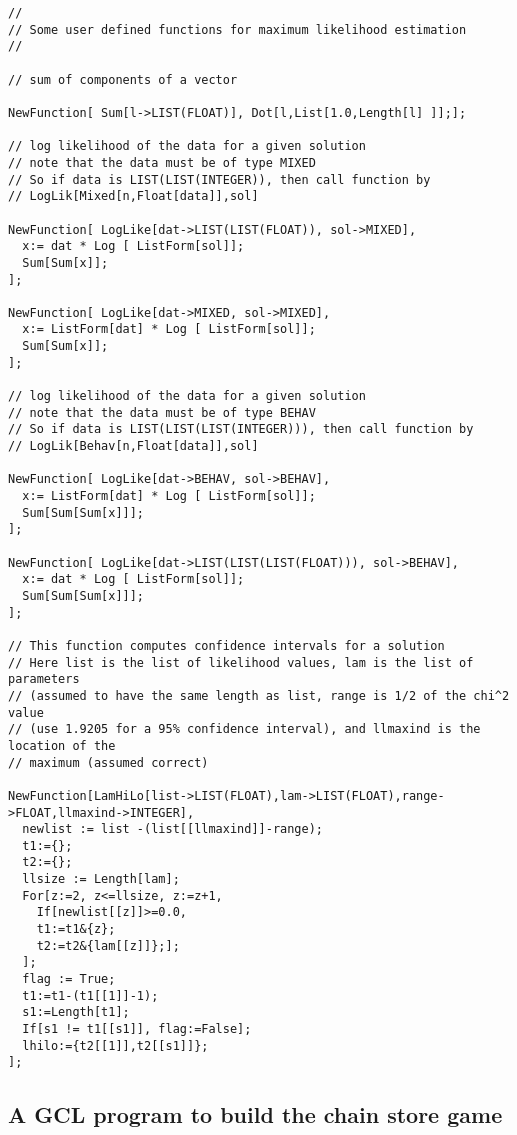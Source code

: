 \begin{verbatim}
//
// Some user defined functions for maximum likelihood estimation
// 

// sum of components of a vector

NewFunction[ Sum[l->LIST(FLOAT)], Dot[l,List[1.0,Length[l] ]];];

// log likelihood of the data for a given solution
// note that the data must be of type MIXED
// So if data is LIST(LIST(INTEGER)), then call function by  
// LogLik[Mixed[n,Float[data]],sol]

NewFunction[ LogLike[dat->LIST(LIST(FLOAT)), sol->MIXED], 
  x:= dat * Log [ ListForm[sol]];
  Sum[Sum[x]];
];

NewFunction[ LogLike[dat->MIXED, sol->MIXED], 
  x:= ListForm[dat] * Log [ ListForm[sol]];
  Sum[Sum[x]];
];

// log likelihood of the data for a given solution
// note that the data must be of type BEHAV
// So if data is LIST(LIST(LIST(INTEGER))), then call function by  
// LogLik[Behav[n,Float[data]],sol]

NewFunction[ LogLike[dat->BEHAV, sol->BEHAV], 
  x:= ListForm[dat] * Log [ ListForm[sol]];
  Sum[Sum[Sum[x]]];
];

NewFunction[ LogLike[dat->LIST(LIST(LIST(FLOAT))), sol->BEHAV], 
  x:= dat * Log [ ListForm[sol]];
  Sum[Sum[Sum[x]]];
];

// This function computes confidence intervals for a solution
// Here list is the list of likelihood values, lam is the list of parameters
// (assumed to have the same length as list, range is 1/2 of the chi^2 value
// (use 1.9205 for a 95% confidence interval), and llmaxind is the location of the 
// maximum (assumed correct) 

NewFunction[LamHiLo[list->LIST(FLOAT),lam->LIST(FLOAT),range->FLOAT,llmaxind->INTEGER],
  newlist := list -(list[[llmaxind]]-range);
  t1:={};
  t2:={};
  llsize := Length[lam];
  For[z:=2, z<=llsize, z:=z+1,
    If[newlist[[z]]>=0.0, 
    t1:=t1&{z}; 
    t2:=t2&{lam[[z]]};];
  ];
  flag := True;
  t1:=t1-(t1[[1]]-1);
  s1:=Length[t1];
  If[s1 != t1[[s1]], flag:=False];
  lhilo:={t2[[1]],t2[[s1]]};
];

\end{verbatim}

\newpage
\subsection{A GCL program to build the chain store game}

